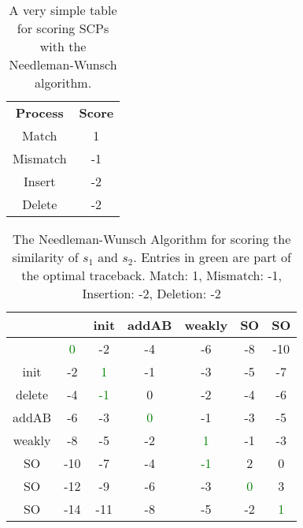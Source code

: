 \begin{table}
\begin{center}

\begin{tabular}{ c c }
 \textbf{Process} & \textbf{Score} \\ 
 Match & 1 \\
 Mismatch & -1 \\
 Insert & -2 \\
 Delete & -2
\end{tabular}
\caption{A very simple table for scoring SCPs with the Needleman-Wunsch algorithm.}
\label{tbl:simpleneed}

\end{center}
\end{table}


\begin{table}
\begin{center}

\begin{tabular}{ c | c c c c c c}
& & init & addAB & weakly  & SO & SO \\ \hline
& \textcolor{green}{0} & -2 & -4 & -6 & -8 & -10 \\

init & -2 & \textcolor{green}{1} & -1 & -3 & -5 & -7 \\

delete & -4 & \textcolor{green}{-1} & 0 & -2 & -4 & -6 \\

addAB& -6 & -3 & \textcolor{green}{0} &-1 &  -3 & -5 \\

weakly& -8 & -5 & -2 & \textcolor{green}{1} & -1 & -3 \\

SO & -10 & -7 &  -4 & \textcolor{green}{-1} & 2 & 0 \\

SO & -12 & -9 & -6 & -3 & \textcolor{green}{0} & 3\\

SO & -14 & -11 & -8 & -5 & -2 & \textcolor{green}{1} 
 
\end{tabular}
\caption{The Needleman-Wunsch Algorithm for scoring the similarity of $s_1$ and $s_2$. Entries in green are part of the optimal traceback. Match: 1, Mismatch: -1, Insertion: -2, Deletion: -2}
\label{tbl:needs1s2}

\end{center}
\end{table}

